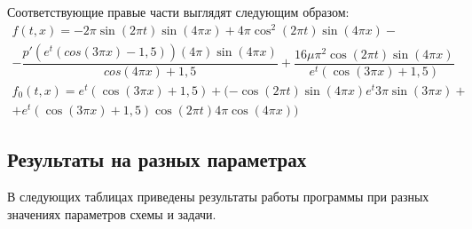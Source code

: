 \documentclass[12pt,a4paper]{article}
\begin{document}
Соответствующие правые части выглядят следующим образом:
\begin{gather*}
    f (t, x) = -2\pi \sin(2\pi t)\sin(4\pi x) + 4\pi\cos^2(2\pi t)\sin(4\pi x) - \\
    - \dfrac{p'(e^t(cos(3\pi x) - 1\!,5))(4\pi)\sin(4\pi x)}{cos(4\pi x) + 1,\!5} + \dfrac{16\mu\pi^2\cos(2\pi t)\sin(4\pi x)
    }{e^t(\cos(3\pi x) + 1,\!5)}   \\
    f_0 (t, x) = e^t(\cos(3\pi x) + 1,\!5) + (-\cos(2\pi t)\sin(4\pi x)e^t3\pi\sin(3\pi x) +\\
    + e^t(\cos(3\pi x) + 1,\!5)\cos(2\pi t)4\pi\cos(4\pi x))
\end{gather*}

\subsection{Результаты на разных параметрах}

В следующих таблицах приведены результаты работы программы при разных значениях параметров схемы и задачи.
\end{document}
